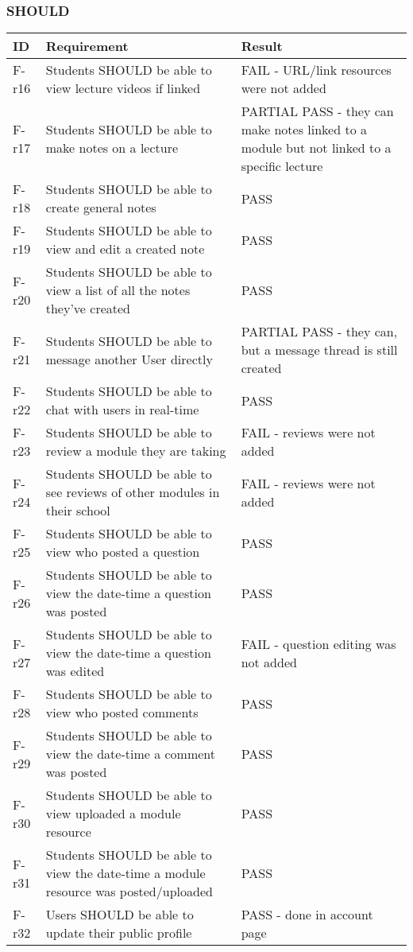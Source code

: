 \subsubsection{SHOULD}

\begin{tabular}{|p{1cm}|p{10cm}|p{3cm}|}
    \hline
        \textbf{ID} & \textbf{Requirement} & \textbf{Result} \\
    \hline
    F-r16 &
    Students SHOULD be able to view lecture videos if linked & 
    FAIL - URL/link resources were not added \\
    \hline
    F-r17 &
    Students SHOULD be able to make notes on a lecture & 
    PARTIAL PASS -  they can make notes linked to a module but not linked to a specific lecture\\
    \hline
    F-r18 &
    Students SHOULD be able to create general notes & 
    PASS \\
    \hline
    F-r19 &
    Students SHOULD be able to view and edit a created note & 
    PASS \\
    \hline
    F-r20 &
    Students SHOULD be able to view a list of all the notes they’ve created & 
    PASS \\
    \hline
    F-r21 &
    Students SHOULD be able to message another User directly & 
    PARTIAL PASS - they can, but a message thread is still created \\
    \hline
    F-r22 &
    Students SHOULD be able to chat with users in real-time & 
    PASS \\
    \hline
    F-r23 &
    Students SHOULD be able to review a module they are taking & 
    FAIL - reviews were not added \\
    \hline
    F-r24 &
    Students SHOULD be able to see reviews of other modules in their school & 
    FAIL - reviews were not added \\
    \hline
    F-r25 &
    Students SHOULD be able to view who posted a question & 
    PASS \\
    \hline
    F-r26 &
    Students SHOULD be able to view the date-time a question was posted & 
    PASS \\
    \hline
    F-r27 &
    Students SHOULD be able to view the date-time a question was edited & 
    FAIL - question editing was not added \\
    \hline
    F-r28 &
    Students SHOULD be able to view who posted comments & 
    PASS \\
    \hline
    F-r29 &
    Students SHOULD be able to view the date-time a comment was posted & 
    PASS \\
    \hline
    F-r30 &
    Students SHOULD be able to view uploaded a module resource & 
    PASS \\
    \hline
    F-r31 &
    Students SHOULD be able to view the date-time a module resource was posted/uploaded & 
    PASS \\
    \hline
    F-r32 &
    Users SHOULD be able to update their public profile & 
    PASS - done in account page \\
    \hline
\end{tabular}

